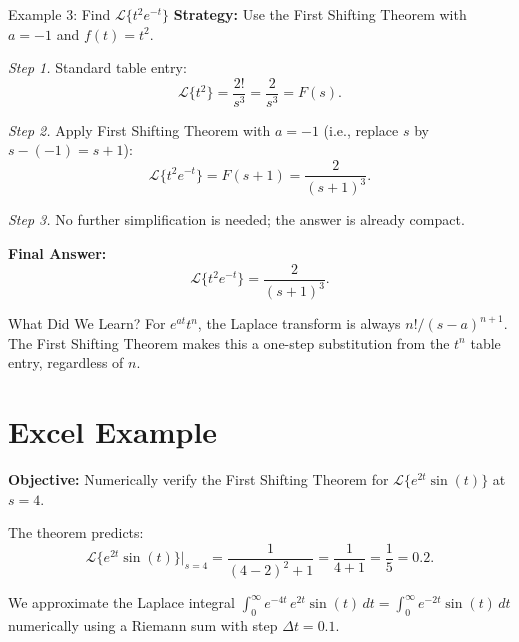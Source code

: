 \documentclass[12pt,a4paper]{article}
\begin{document}
\begin{infobox}{Example 3: Find $\mathcal{L}\{t^2 e^{-t}\}$}
\textbf{Strategy:} Use the First Shifting Theorem with $a = -1$ and $f(t) = t^2$.

\emph{Step 1.} Standard table entry:
\[
  \mathcal{L}\{t^2\} = \frac{2!}{s^3} = \frac{2}{s^3} = F(s).
\]

\emph{Step 2.} Apply First Shifting Theorem with $a = -1$
(i.e., replace $s$ by $s-(-1) = s+1$):
\[
  \mathcal{L}\{t^2 e^{-t}\} = F(s+1) = \frac{2}{(s+1)^3}.
\]

\emph{Step 3.} No further simplification is needed; the answer is already compact.

\textbf{Final Answer:}
\[
  \mathcal{L}\{t^2 e^{-t}\} = \frac{2}{(s+1)^3}.
\]
\end{infobox}

\begin{learnbox}{What Did We Learn?}
For $e^{at}t^n$, the Laplace transform is always $n!/(s-a)^{n+1}$. The First Shifting Theorem
makes this a one-step substitution from the $t^n$ table entry, regardless of $n$.
\end{learnbox}

\section{Excel Example }

\textbf{Objective:} Numerically verify the First Shifting Theorem for
$\mathcal{L}\{e^{2t}\sin(t)\}$ at $s = 4$.

The theorem predicts:
\[
  \mathcal{L}\{e^{2t}\sin(t)\}\Big|_{s=4}
  = \frac{1}{(4-2)^2 + 1} = \frac{1}{4+1} = \frac{1}{5} = 0.2.
\]

We approximate the Laplace integral
$\displaystyle\int_0^{\infty} e^{-4t}\,e^{2t}\sin(t)\,dt
= \int_0^{\infty} e^{-2t}\sin(t)\,dt$
numerically using a Riemann sum with step $\Delta t = 0.1$.
\end{document}
